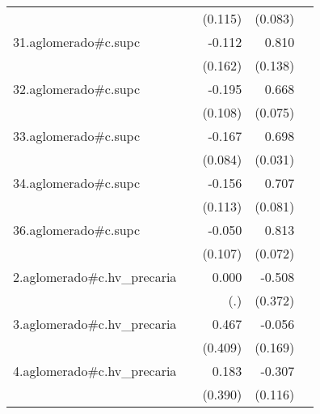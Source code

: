 {\begin{longtable}{l*{4}{D{.}{.}{-1}}}
            &                     &     (0.115)         &     (0.083)         &                     \\
\addlinespace
31.aglomerado#c.supc&                     &      -0.112         &       0.810\sym{***}&                     \\
            &                     &     (0.162)         &     (0.138)         &                     \\
\addlinespace
32.aglomerado#c.supc&                     &      -0.195         &       0.668\sym{***}&                     \\
            &                     &     (0.108)         &     (0.075)         &                     \\
\addlinespace
33.aglomerado#c.supc&                     &      -0.167\sym{*}  &       0.698\sym{***}&                     \\
            &                     &     (0.084)         &     (0.031)         &                     \\
\addlinespace
34.aglomerado#c.supc&                     &      -0.156         &       0.707\sym{***}&                     \\
            &                     &     (0.113)         &     (0.081)         &                     \\
\addlinespace
36.aglomerado#c.supc&                     &      -0.050         &       0.813\sym{***}&                     \\
            &                     &     (0.107)         &     (0.072)         &                     \\
\addlinespace
2.aglomerado#c.hv\_precaria&                     &       0.000         &      -0.508         &                     \\
            &                     &         (.)         &     (0.372)         &                     \\
\addlinespace
3.aglomerado#c.hv\_precaria&                     &       0.467         &      -0.056         &                     \\
            &                     &     (0.409)         &     (0.169)         &                     \\
\addlinespace
4.aglomerado#c.hv\_precaria&                     &       0.183         &      -0.307\sym{**} &                     \\
            &                     &     (0.390)         &     (0.116)         &                     \\

\end{longtable}}
